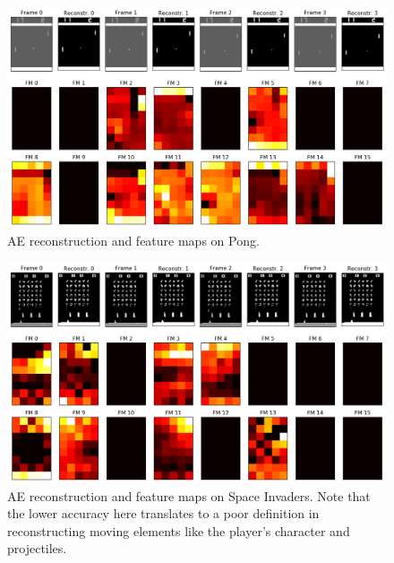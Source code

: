 %
%
\begin{figure}
    \includegraphics[width=\textwidth]{pictures/experiments/reconstr_pong}
    \centering
    \caption[AE reconstruction and feature maps on Pong]{AE reconstruction 
    and feature maps on Pong.}
    \label{f:P_reconstr}
\end{figure}
%
%
\begin{figure}
    \includegraphics[width=\textwidth]{pictures/experiments/reconstr_space_invaders}
    \centering
    \caption[AE reconstruction and feature maps on Space Invaders]{AE reconstruction 
    and feature maps on Space Invaders. Note that the lower accuracy here translates
    to a poor definition in reconstructing moving elements like the player's
    character and projectiles.}
    \label{f:SI_reconstr}
\end{figure}
%

